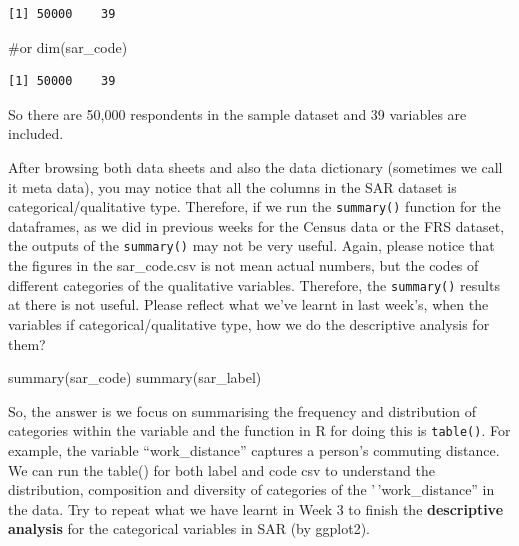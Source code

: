 \documentclass[
  letterpaper,
  DIV=11,
  numbers=noendperiod]{scrreprt}
\newenvironment{Shaded}{\begin{snugshade}}{\end{snugshade}}
\newcommand{\CommentTok}[1]{\textcolor[rgb]{0.37,0.37,0.37}{#1}}
\newcommand{\FunctionTok}[1]{\textcolor[rgb]{0.28,0.35,0.67}{#1}}
\newcommand{\NormalTok}[1]{\textcolor[rgb]{0.00,0.23,0.31}{#1}}
\newcommand{\SpecialCharTok}[1]{\textcolor[rgb]{0.37,0.37,0.37}{#1}}
\begin{document}
\begin{verbatim}
[1] 50000    39
\end{verbatim}

\begin{Shaded}
\begin{Highlighting}[]
\CommentTok{\#or}
\FunctionTok{dim}\NormalTok{(sar\_code)}
\end{Highlighting}
\end{Shaded}

\begin{verbatim}
[1] 50000    39
\end{verbatim}

So there are 50,000 respondents in the sample dataset and 39 variables
are included.

After browsing both data sheets and also the data dictionary (sometimes
we call it meta data), you may notice that all the columns in the SAR
dataset is categorical/qualitative type. Therefore, if we run the
\texttt{summary()} function for the dataframes, as we did in previous
weeks for the Census data or the FRS dataset, the outputs of the
\texttt{summary()} may not be very useful. Again, please notice that the
figures in the sar\_code.csv is not mean actual numbers, but the codes
of different categories of the qualitative variables. Therefore, the
\texttt{summary()} results at there is not useful. Please reflect what
we've learnt in last week's, when the variables if
categorical/qualitative type, how we do the descriptive analysis for
them?

\begin{Shaded}
\begin{Highlighting}[]
\FunctionTok{summary}\NormalTok{(sar\_code)}
\FunctionTok{summary}\NormalTok{(sar\_label)}
\end{Highlighting}
\end{Shaded}

So, the answer is we focus on summarising the frequency and distribution
of categories within the variable and the function in R for doing this
is \texttt{table()}. For example, the variable ``work\_distance''
captures a person's commuting distance. We can run the table() for both
label and code csv to understand the distribution, composition and
diversity of categories of the '\,'work\_distance'' in the data. Try to
repeat what we have learnt in Week 3 to finish the \textbf{descriptive
analysis} for the categorical variables in SAR (by ggplot2).

\begin{Shaded}
\end{Shaded}
\end{document}
